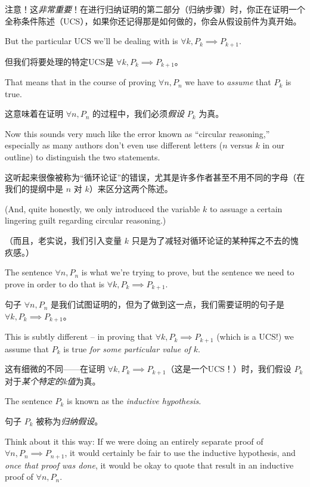 注意！这\emph{非常重要}！在进行归纳证明的第二部分（归纳步骤）时，你正在证明一个全称条件陈述（UCS），如果你还记得那是如何做的，你会从假设前件为真开始。

But the particular UCS we'll
be dealing with is $\forall k,  P_k \implies P_{k+1}$.

但我们将要处理的特定UCS是 $\forall k,  P_k \implies P_{k+1}$。

That means
that in the course of proving $\forall n,  P_n$ we have to \emph{assume}
 that $P_k$ is true.

这意味着在证明 $\forall n,  P_n$ 的过程中，我们必须\emph{假设} $P_k$ 为真。

Now this sounds very much like the error known
as ``circular reasoning,'' especially as many authors don't even
use different letters ($n$ versus $k$ in our outline) to distinguish
the two statements.

这听起来很像被称为“循环论证”的错误，尤其是许多作者甚至不用不同的字母（在我们的提纲中是 $n$ 对 $k$）来区分这两个陈述。

(And, quite honestly, we only introduced the variable
$k$ to assuage a certain lingering guilt regarding circular reasoning.)

（而且，老实说，我们引入变量 $k$ 只是为了减轻对循环论证的某种挥之不去的愧疚感。）

The sentence $\forall n,  P_n$ is what we're trying to prove, but the
sentence we need to prove in order to do that is $\forall k,  P_k \implies P_{k+1}$.

句子 $\forall n,  P_n$ 是我们试图证明的，但为了做到这一点，我们需要证明的句子是 $\forall k,  P_k \implies P_{k+1}$。

This is subtly different -- in proving that $\forall k,  P_k \implies P_{k+1}$
(which is a UCS!) we assume that $P_k$ is true {\em for some particular value of $k$}.

这有细微的不同——在证明 $\forall k,  P_k \implies P_{k+1}$（这是一个UCS！）时，我们假设 $P_k$ 对于{\em 某个特定的k值}为真。

The sentence $P_k$ is known as the 
\emph{inductive hypothesis}.

句子 $P_k$ 被称为\emph{归纳假设}。

Think about it this way:  If we were doing an entirely separate
proof of $\forall n,  P_n \implies P_{n+1}$, it would certainly be fair
to use the inductive hypothesis, and \emph{once that proof was done}, 
it would be okay to quote that result in an inductive proof of 
$\forall n,  P_n$.

